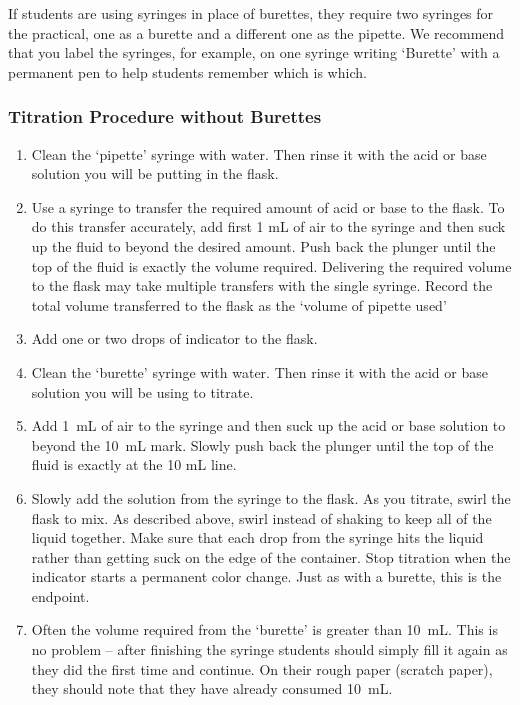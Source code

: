 If students are using syringes in place of burettes, they require two syringes for the practical, one as a burette and a different one as the pipette. We recommend that you label the syringes, for example, on one syringe writing ‘Burette’ with a permanent pen to help students remember which is which.

\subsubsection{Titration Procedure without Burettes}

\begin{enumerate}

\item{Clean the ‘pipette’ syringe with water. Then rinse it with the acid or base solution you will be putting in the flask.}

\item{Use a syringe to transfer the required amount of acid or base to the flask. To do this transfer accurately, add first 1 mL of air to the syringe and then suck up the fluid to beyond the desired amount. Push back the plunger until the top of the fluid is exactly the volume required. Delivering the required volume to the flask may take multiple transfers with the single syringe. Record the total volume transferred to the flask as the ‘volume of pipette used’}

\item{Add one or two drops of indicator to the flask.}

\item{Clean the ‘burette’ syringe with water. Then rinse it with the acid or base solution you will be using to titrate.}

\item{Add 1~mL of air to the syringe and then suck up the acid or base solution to beyond the 10~mL mark. Slowly push back the plunger until the top of the fluid is exactly at the 10 mL line.}

\item{Slowly add the solution from the syringe to the flask. As you titrate, swirl the flask to mix. As described above, swirl instead of shaking to keep all of the liquid together. Make sure that each drop from the syringe hits the liquid rather than getting suck on the edge of the container. Stop titration when the indicator starts a permanent color change. Just as with a burette, this is the endpoint.}

\item{Often the volume required from the ‘burette’ is greater than 10~mL. This is no problem – after finishing the syringe students should simply fill it again as they did the first time and continue. On their rough paper (scratch paper), they should note that they have already consumed 10~mL.}

\end{enumerate}

